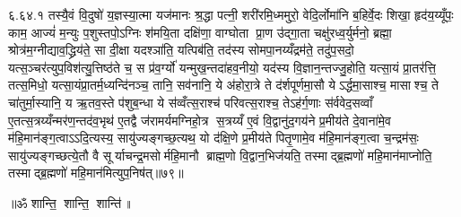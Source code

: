 ६.६४.१
तस्यै॒वं  वि॒दुषो॑ य॒ज्ञस्या॒त्मा यज॑मानः श्र॒द्धा पत्नी॒ शरी॑रमि॒ध्ममुरो॒ वेदि॒र्लोमा॑नि ब॒\ar{}हिर्वे॒दः  शिखा॒ हृद॑य॒य्यूँपः॒ काम॒ आज्यं॑ म॒न्युः प॒शुस्तपो॒ऽग्निः  श॑मयि॒ता दक्षि॑णा॒ वाग्घोता प्रा॒ण उ॑द्गा॒ता चक्षु॑रध्व॒र्युर्मनो॒ ब्रह्मा॒ श्रोत्र॑म॒ग्नीद्याव॒द्ध्रिय॑ते॒ सा दी॒क्षा यदश्ञा॑ति॒ यत्पिब॑ति॒ तद॑स्य सोमपा॒नय्यँद्रम॑ते॒ तदु॑प॒सदो॒ यत्स॒ञ्चर॑त्युप॒विश॑त्यु॒त्तिष्ठ॑ते च॒ स प्र॑व॒र्ग्यो॑ यन्मुख॒न्तदा॑हव॒नीयो॒ यद॑स्य वि॒ज्ञान॒न्तज्जु॒होति॒ यत्सा॒यं प्रा॒तर॑त्ति॒ तत्स॒मिधो॒ यत्सा॒यंप्रा॒तर्म॒ध्यन्दि॑नञ्च॒ तानि॒ सव॑नानि॒ ये अ॑होरा॒त्रे ते द॑र्\mbox{}शपूर्णमा॒सौ येऽर्द्धमा॒साश्च॒ मासाश्च॒ ते चा॑तुर्मा॒स्यानि॒ य ऋ॒तव॒स्ते प॑शुब॒न्धा ये स॑व्वँत्स॒राश्च॑ परिवत्स॒राश्च॒ तेऽह॑र्ग॒णाः स॑र्ववेद॒सव्वाँ ए॒तत्स॒त्रय्यँन्मर॑ण॒न्तद॑व॒भृथ॑ ए॒तद्वै ज॑रामर्यमग्निहो॒त्र स॒त्रय्यँ ए॒वं  वि॒द्वानु॑द॒गय॑ने प्र॒मीय॑ते दे॒वाना॑मे॒व म॑हि॒मान॑ङ्ग॒त्वाऽऽदि॒त्यस्य॒ सायु॑ज्यङ्गच्छ॒त्यथ॒ यो द॑क्षि॒णे प्र॒मीय॑ते पितृ॒णामे॒व म॑हि॒मान॑ङ्ग॒त्वा च॒न्द्रम॑सः॒ सायु॑ज्यङ्गच्छत्ये॒तौ वै सूर्याचन्द्र॒मसोर्महि॒मानौ ब्राह्म॒णो वि॒द्वान॒भिज॑यति॒ तस्माद्ब्र॒ह्मणो॑ महि॒मान॑माप्नोति॒ तस्माद्ब्र॒ह्मणो॑ महि॒मान॑मित्युप॒निष॑त्॥७९॥
\anuvakamend

\centerline{॥ॐ शान्ति॒ शान्ति॒ शान्ति॑॥}
